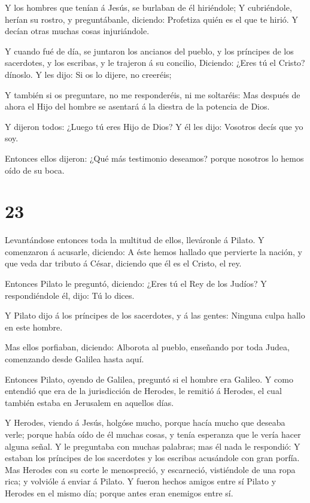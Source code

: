  Y los hombres que tenían á Jesús, se burlaban de él
hiriéndole;  Y cubriéndole, herían su rostro, y
preguntábanle, diciendo: Profetiza quién es el que te hirió.
 Y decían otras muchas cosas injuriándole.

 Y cuando fué de día, se juntaron los ancianos del pueblo,
y los príncipes de los sacerdotes, y los escribas, y le trajeron á su
concilio,  Diciendo: ¿Eres tú el Cristo? dínoslo. Y les
dijo: Si os lo dijere, no creeréis;

 Y también si os preguntare, no me responderéis, ni me
soltaréis:  Mas después de ahora el Hijo del hombre se
asentará á la diestra de la potencia de Dios.

 Y dijeron todos: ¿Luego tú eres Hijo de Dios? Y él les
dijo: Vosotros decís que yo soy.

 Entonces ellos dijeron: ¿Qué más testimonio deseamos?
porque nosotros lo hemos oído de su boca.

\hypertarget{section-22}{%
\section{23}\label{section-22}}

 Levantándose entonces toda la multitud de ellos, lleváronle
á Pilato.  Y comenzaron á acusarle, diciendo: A éste hemos
hallado que pervierte la nación, y que veda dar tributo á César,
diciendo que él es el Cristo, el rey.

 Entonces Pilato le preguntó, diciendo: ¿Eres tú el Rey de
los Judíos? Y respondiéndole él, dijo: Tú lo dices.

 Y Pilato dijo á los príncipes de los sacerdotes, y á las
gentes: Ninguna culpa hallo en este hombre.

 Mas ellos porfiaban, diciendo: Alborota al pueblo,
enseñando por toda Judea, comenzando desde Galilea hasta aquí.

 Entonces Pilato, oyendo de Galilea, preguntó si el hombre
era Galileo.  Y como entendió que era de la jurisdicción de
Herodes, le remitió á Herodes, el cual también estaba en Jerusalem en
aquellos días.

 Y Herodes, viendo á Jesús, holgóse mucho, porque hacía
mucho que deseaba verle; porque había oído de él muchas cosas, y tenía
esperanza que le vería hacer alguna señal.  Y le preguntaba
con muchas palabras; mas él nada le respondió:  Y estaban
los príncipes de los sacerdotes y los escribas acusándole con gran
porfía.  Mas Herodes con su corte le menospreció, y
escarneció, vistiéndole de una ropa rica; y volvióle á enviar á Pilato.
 Y fueron hechos amigos entre sí Pilato y Herodes en el
mismo día; porque antes eran enemigos entre sí.

